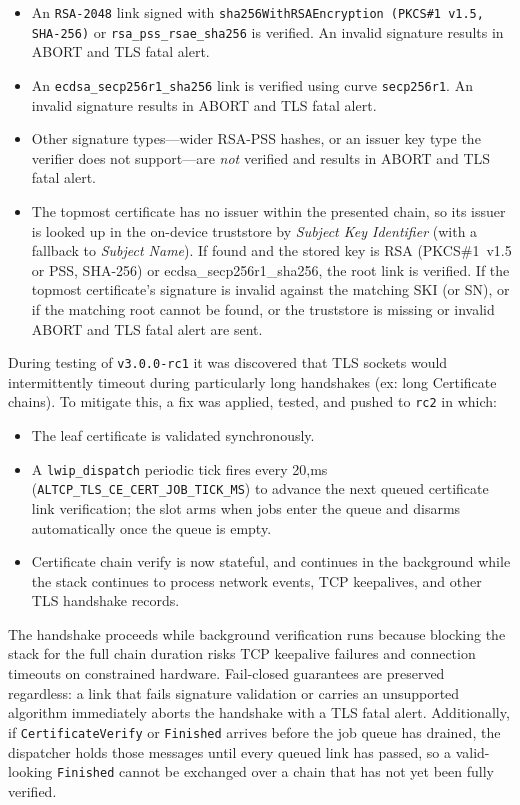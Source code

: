 \documentclass[titlepage]{report}
\begin{document}
	\begin{itemize}
		\item An \texttt{RSA-2048} link signed with \texttt{sha256WithRSAEncryption (PKCS\#1~v1.5, SHA-256)} or \texttt{rsa\_pss\_rsae\_sha256} is verified. An invalid signature results in ABORT and TLS fatal alert.
		\item An \texttt{ecdsa\_secp256r1\_sha256} link is verified using curve \texttt{secp256r1}. An invalid signature results in ABORT and TLS fatal alert.
		\item Other signature types---wider RSA-PSS hashes, or an issuer key type the verifier does not support---are \emph{not} verified and results in ABORT and TLS fatal alert.
		\item The topmost certificate has no issuer within the presented chain, so its issuer is looked up in the on-device truststore by \textit{Subject Key Identifier} (with a fallback to \textit{Subject Name}). If found and the stored key is RSA (PKCS\#1~v1.5 or PSS, SHA-256) or ecdsa\_secp256r1\_sha256, the root link is verified. If the topmost certificate's signature is invalid against the matching SKI (or SN), or if the matching root cannot be found, or the truststore is missing or invalid ABORT and TLS fatal alert are sent.
	\end{itemize}

	During testing of \texttt{v3.0.0-rc1} it was discovered that TLS sockets would intermittently timeout during particularly long handshakes (ex: long Certificate chains). To mitigate this, a fix was applied, tested, and pushed to \texttt{rc2} in which:

	\begin{itemize}
		\item The leaf certificate is validated synchronously.
		\item A \texttt{lwip\_dispatch} periodic tick fires every 20,ms (\texttt{ALTCP\_TLS\_CE\_CERT\_JOB\_TICK\_MS}) to advance the next queued certificate link verification; the slot arms when jobs enter the queue and disarms automatically once the queue is empty.
		\item Certificate chain verify is now stateful, and continues in the background while the stack continues to process network events, TCP keepalives, and other TLS handshake records.
	\end{itemize}

	The handshake proceeds while background verification runs because blocking the stack for the full chain duration risks TCP keepalive failures and connection timeouts on constrained hardware. Fail-closed guarantees are preserved regardless: a link that fails signature validation or carries an unsupported algorithm immediately aborts the handshake with a TLS fatal alert. Additionally, if \texttt{CertificateVerify} or \texttt{Finished} arrives before the job queue has drained, the dispatcher holds those messages until every queued link has passed, so a valid-looking \texttt{Finished} cannot be exchanged over a chain that has not yet been fully verified.
\end{document}

